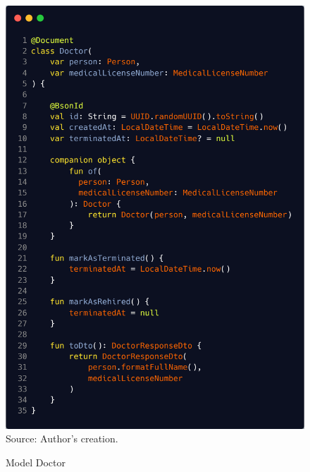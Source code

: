 \begin{figure}[HContext]
	\centering
	\caption{Model Doctor}
	\includegraphics[width=1\linewidthContext]{figures/doctor}
	\label{fig:doctor}
	\footnotesize Source: Author's creation.
\end{figure}

